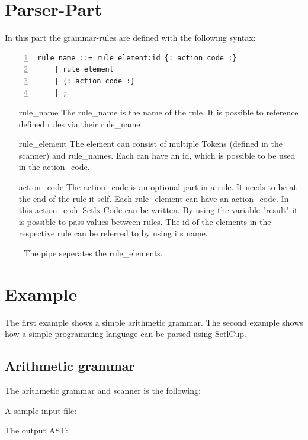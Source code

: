 \section{Parser-Part}
In this part the grammar-rules are defined with the following syntax:
\begin{lstlisting}[frame=single,numbers=left,basicstyle=\footnotesize]
rule_name ::= rule_element:id {: action_code :} 
	| rule_element
	| {: action_code :} 
	| ;
\end{lstlisting}
\begin{itemize}
	\item[rule\_name] The rule\_name is the name of the rule. It is possible to reference defined rules via their rule\_name
	\item[rule\_element] The element can consist of multiple Tokens (defined in the scanner) and rule\_names. Each can have an id, which is possible to be used in the action\_code.
	\item[action\_code] The action\_code is an optional part in a rule. It needs to be at the end of the rule it self. Each rule\_element can have an action\_code. In this action\_code Setlx Code can be written. By using the variable "result" it is possible to pass values between rules. The id of the elements in the respective rule can be referred to by using its name.
	\item[|] The pipe seperates the rule\_elements.
\end{itemize}
\newpage
\section{Example}
The first example shows a simple arithmetic grammar.
The second example shows how a simple programming language can be parsed using SetlCup.
\subsection{Arithmetic grammar}
The arithmetic grammar and scanner is the following:

A sample input file:

The output AST:


